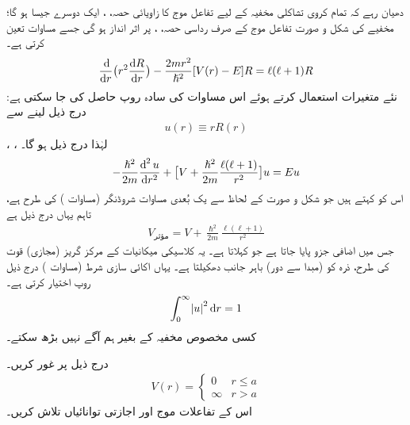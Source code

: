دھیان رہے کہ تمام کروی تشاکلی مخفیہ کے لیے تفاعل موج کا زاویائی حصہ، ، ایک دوسرے جیسا ہو گا؛ مخفیے  کی شکل و صورت تفاعل موج کے صرف رداسی حصہ، ، پر اثر انداز ہو گی جسے مساوات  تعین کرتی ہے۔
\begin{align}
\frac{\dif}{\dif r}\big(r^{2}\frac{\dif R}{\dif r}\big)-\frac{2mr^{2}}{\hslash^{2}}[V(r)-E]R=\ell(\ell+1)R
\end{align}
نئے متغیرات استعمال کرتے ہوئے اس مساوات کی سادہ روپ حاصل کی جا سکتی ہے: درج ذیل لینے سے
\begin{align}\label{مساوات_ابعادی_نئے_متغیر_رداسی}
u(r)\equiv{rR(r)} 
\end{align} 
، ،  لہٰذا درج ذیل ہو گا۔
\begin{align}\label{مساوات_ابعادی_رداسی}
-\frac{\hslash^{2}}{2m}\frac{\dif^{\,2}u}{\dif r^{2}}+\big[V+\frac{\hslash^{2}}{2m}\frac{\ell(\ell+1)}{r^{2}}\big]u=Eu
\end{align}
اس کو  کہتے ہیں جو شکل و صورت کے لحاظ سے یک بُعدی مساوات شروڈنگر (مساوات ) کی طرح ہے، تاہم یہاں  درج ذیل ہے
\begin{align}\label{مساوات_تین_ابعادی_موثر_مخفیہ}
V_{\text{مؤثر}}=V+\frac{\hslash^{2}}{2m}\frac{\ell(\ell+1)}{r^{2}} 
\end{align}
 جس میں  اضافی جزو پایا جاتا ہے جو  کہلاتا ہے۔ یہ کلاسیکی میکانیات کے مرکز گریز (مجازی) قوت کی طرح، ذرہ کو (مبدا سے دور) باہر جانب دھکیلتا ہے۔ یہاں اکائی سازی شرط (مساوات ) درج ذیل روپ اختیار کرتی ہے۔ 
\begin{align}
\int_{0}^{\infty}\abs{u}^{2}\dif r=1 
\end{align}
کسی مخصوص مخفیہ  کے بغیر ہم آگے نہیں بڑھ سکتے۔

درج ذیل  پر غور کریں۔
\begin{align}
V(r)=\begin{cases}
0&r\le {a}\\
\infty&r>a
\end{cases} 
\end{align}
اس کے تفاعلات موج اور اجازتی توانائیاں تلاش کریں۔

